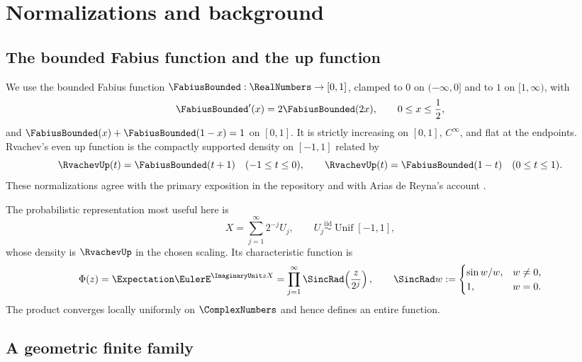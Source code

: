 \documentclass[11pt]{article}
\numberwithin{equation}{section}
\theoremstyle{definition}
\theoremstyle{remark}
\begin{document}
\section{Normalizations and background}
\label{sec:background}

\subsection{The bounded Fabius function and the up function}

We use the bounded Fabius function $\FabiusBounded:\RealNumbers\to[0,1]$, clamped to $0$ on
$(-\infty,0]$ and to $1$ on $[1,\infty)$, with
\begin{equation}
 \FabiusBounded'(x)=2\FabiusBounded(2x),\qquad 0\le x\le\frac12,
 \label{eq:fabius-diff}
\end{equation}
and $\FabiusBounded(x)+\FabiusBounded(1-x)=1$ on $[0,1]$.  It is strictly increasing on $[0,1]$,
$C^\infty$, and flat at the endpoints.  Rvachev's even up function is the
compactly supported density on $[-1,1]$ related by
\begin{equation}
  \RvachevUp(t)=\FabiusBounded(t+1)\quad(-1\le t\le0),\qquad
  \RvachevUp(t)=\FabiusBounded(1-t)\quad(0\le t\le1).
  \label{eq:F-up}
\end{equation}
These normalizations agree with the primary exposition in the repository and
with Arias de Reyna's account \cite{AriasDefinition,AriasArithmetic}.

The probabilistic representation most useful here is
\begin{equation}
 X=\sum_{j=1}^{\infty}2^{-j}U_j,
 \qquad U_j\stackrel{\mathrm{iid}}{\sim}\operatorname{Unif}[-1,1],
 \label{eq:rvachev-random-series}
\end{equation}
whose density is $\RvachevUp$ in the chosen scaling.  Its characteristic function is
\begin{equation}
 \Phi(z)=\Expectation\EulerE^{\ImaginaryUnit zX}
 =\prod_{j=1}^{\infty}\SincRad\!\left(\frac{z}{2^j}\right),
 \qquad \SincRad w:=\begin{cases}\sin w/w,&w\ne0,\\1,&w=0.\end{cases}
 \label{eq:dyadic-infinite-product}
\end{equation}
The product converges locally uniformly on $\ComplexNumbers$ and hence defines an entire
function.

\subsection{A geometric finite family}
\end{document}
